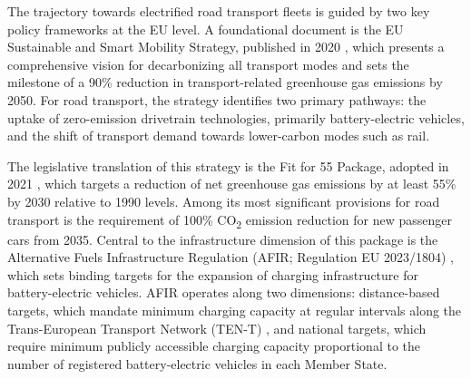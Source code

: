 The trajectory towards electrified road transport fleets is guided by two key policy frameworks at the EU level. A foundational document is the EU Sustainable and Smart Mobility Strategy, published in 2020 \cite{EC2020SustainableMobility}, which presents a comprehensive vision for decarbonizing all transport modes and sets the milestone of a 90\% reduction in transport-related greenhouse gas emissions by 2050. For road transport, the strategy identifies two primary pathways: the uptake of zero-emission drivetrain technologies, primarily battery-electric vehicles, and the shift of transport demand towards lower-carbon modes such as rail.

The legislative translation of this strategy is the Fit for 55 Package, adopted in 2021 \cite{EC2021Fitfor55}, which targets a reduction of net greenhouse gas emissions by at least 55\% by 2030 relative to 1990 levels. Among its most significant provisions for road transport is the requirement of 100\% CO\textsubscript{2} emission reduction for new passenger cars from 2035. Central to the infrastructure dimension of this package is the Alternative Fuels Infrastructure Regulation (AFIR; Regulation EU 2023/1804) \cite{EU2023AFIR}, which sets binding targets for the expansion of charging infrastructure for battery-electric vehicles. AFIR operates along two dimensions: distance-based targets, which mandate minimum charging capacity at regular intervals along the Trans-European Transport Network (TEN-T) \cite{EU2024TENT}, and national targets, which require minimum publicly accessible charging capacity proportional to the number of registered battery-electric vehicles in each Member State.


